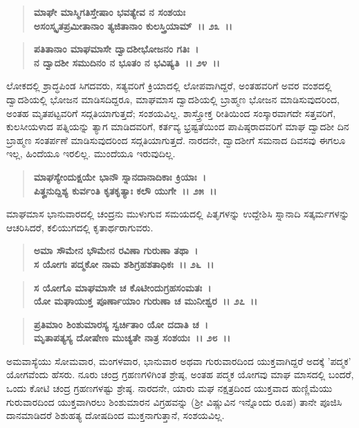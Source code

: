 \begin{verse}
\textbf{ಮಾಘೇ ಮಾಸ್ಮಿಗತಿಸ್ತೇಷಾಂ ಭವತ್ಯೇವ ನ ಸಂಶಯಃ}\\\textbf{ಅಸಂಸ್ಕೃತಪ್ರಮೀತಾನಾಂ ತ್ಯಜಿತಾನಾಂ ಕುಲಸ್ತ್ರಿಯಾಮ್~।। ೨೩~।। }
\end{verse}

\begin{verse}
\textbf{ಪತಿತಾನಾಂ ಮಾಘಮಾಸೇ ದ್ವಾದಶೀಭೋಜನಂ ಗತಿಃ~।}\\\textbf{ನ ದ್ವಾದಶೀ ಸಮುದಿನಂ ನ ಭೂತಂ ನ ಭವಿಷ್ಯತಿ~।। ೨೪~।।}
\end{verse}

ಲೋಕದಲ್ಲಿ ಶ್ರಾದ್ಧಪಿಂಡ ಸಿಗದವರು, ಸತ್ಯವರಿಗೆ ಕ್ರಿಯಾದಲ್ಲಿ ಲೋಪವಾಗಿದ್ದರೆ, ಅಂತಹವರಿಗೆ ಅವರ ವಂಶದಲ್ಲಿ ದ್ವಾದಶಿಯಲ್ಲಿ ಭೋಜನ ಮಾಡಿಸದಿದ್ದರೂ, ಮಾಘಮಾಸ ದ್ವಾದಶಿಯಲ್ಲಿ ಬ್ರಾಹ್ಮಣ ಭೋಜನ ಮಾಡಿಸುವುದರಿಂದ, ಅಂತಹ ಮೃತಪಟ್ಟವರಿಗೆ ಸದ್ಗತಿಯಾಗುತ್ತದೆ; ಸಂಶಯವಿಲ್ಲ. ಶಾಸ್ತ್ರೋಕ್ತ ರೀತಿಯಿಂದ ಸಂಸ್ಕಾರವಾಗದೇ ಸತ್ತವರಿಗೆ, ಕುಲಸೀಯಳಾದ ಪತ್ನಿಯನ್ನು ತ್ಯಾಗ ಮಾಡಿದವರಿಗೆ, ಕರ್ತವ್ಯ ಭ್ರಷ್ಟತೆಯಿಂದ ಪಾಪಿಷ್ಠರಾದವರಿಗೆ ಮಾಘ ದ್ವಾದಶೀ ದಿನ ಬ್ರಾಹ್ಮಣ ಸಂತರ್ಪಣೆ ಮಾಡಿಸುವುದರಿಂದ ಸದ್ಗತಿಯಾಗುತ್ತದೆ. ನಾರದನೇ, ದ್ವಾದಶೀಗೆ ಸಮನಾದ ದಿವಸವು ಈಗಲೂ ಇಲ್ಲ, ಹಿಂದೆಯೂ ಇರಲಿಲ್ಲ. ಮುಂದೆಯೂ ಇರುವುದಿಲ್ಲ.

\begin{verse}
\textbf{ಮಾಘಸ್ಯೇಂದುಕ್ಷಯೇ ಭಾನೌ ಸ್ನಾನದಾನಾದಿಕಾಃ ಕ್ರಿಯಾಃ~।}\\\textbf{ಪಿತೄನುದ್ದಿಶ್ಯ ಕುರ್ವಂತಿ ಕೃತಕೃತ್ಯಾಃ ಕಲೌ ಯುಗೇ~।। ೨೫~।।}
\end{verse}

ಮಾಘಮಾಸ ಭಾನುವಾರದಲ್ಲಿ ಚಂದ್ರನು ಮುಳುಗುವ ಸಮಯದಲ್ಲಿ ಪಿತೃಗಳನ್ನು ಉದ್ದೇಶಿಸಿ ಸ್ನಾನಾದಿ ಸತ್ಕರ್ಮಗಳನ್ನು ಆಚರಿಸಿದರೆ, ಕಲಿಯುಗದಲ್ಲಿ ಕೃತಾರ್ಥರಾಗುವರು.

\begin{verse}
\textbf{ಅಮಾ ಸೌಮೇನ ಭೌಮೇನ ರವಿಣಾ ಗುರುಣಾ ತಥಾ~।}\\\textbf{ಸ ಯೋಗಃ ಪದ್ಮಕೋ ನಾಮ ಶಶಿಗ್ರಹಶತಾಧಿಕಃ~।। ೨೬~।। }
\end{verse}

\begin{verse}
\textbf{ಸ ಯೋಗೊ ಮಾಘಮಾಸೇ ಚ ಕೊಟೀಂದುಗ್ರಹಸಂಮತಃ~।}\\\textbf{ಯೋ ಮಘಾಯುಕ್ತ ಪೂರ್ಣಾಯಾಂ ಗುರುಣಾ ಚ ಮುನೀಶ್ವರ~।। ೨೭~।। }
\end{verse}

\begin{verse}
\textbf{ಪ್ರತಿಮಾಂ ಶಿಂಶುಮಾರಸ್ಯ ಸ್ವರ್ಚಿತಾಂ ಯೋ ದದಾತಿ ಚ~।}\\\textbf{ಮೃತಾಪತ್ಯಸ್ಯ ದೋಷೇಣ ಮುಚ್ಯತೇ ನಾತ್ರ ಸಂಶಯಃ~।। ೨೮~।।}
\end{verse}

ಅಮವಾಸ್ಯೆಯು ಸೋಮವಾರ, ಮಂಗಳವಾರ, ಭಾನುವಾರ ಅಥವಾ ಗುರುವಾರದಿಂದ ಯುಕ್ತವಾಗಿದ್ದರೆ ಅದಕ್ಕೆ 'ಪದ್ಮಕ' ಯೋಗವೆಂದು ಹೆಸರು. ನೂರು ಚಂದ್ರ ಗ್ರಹಣಗಳಿಗಿಂತ ಶ್ರೇಷ್ಠ, ಅಂತಹ ಪದ್ಮಕ ಯೋಗವು ಮಾಘ ಮಾಸದಲ್ಲಿ ಬಂದರೆ, ಒಂದು ಕೋಟಿ ಚಂದ್ರ ಗ್ರಹಣಗಳಷ್ಟು ಶ್ರೇಷ್ಠ. ನಾರದನೇ, ಯಾರು ಮಘ ನಕ್ಷತ್ರದಿಂದ ಯುಕ್ತವಾದ ಹುಣ್ಣಿಮೆಯು ಗುರುವಾರದಿಂದ ಯುಕ್ತವಾಗಿರಲು ಶಿಂಶುಮಾರನ ವಿಗ್ರಹವನ್ನು (ಶ‍್ರೀ ವಿಷ್ಣುವಿನ ಇನ್ನೊಂದು ರೂಪ) ತಾನೇ ಪೂಜಿಸಿ ದಾನಮಾಡಿದರೆ ಶಿಶುಹತ್ಯ ದೋಷದಿಂದ ಮುಕ್ತನಾಗುತ್ತಾನೆ, ಸಂಶಯವಿಲ್ಲ.

